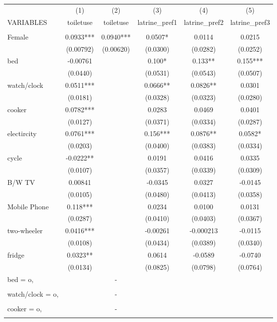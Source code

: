\documentclass[]{article}
\begin{document}
\begin{tabular}{lccccc} \hline
 & (1) & (2) & (3) & (4) & (5) \\
VARIABLES & toiletuse & toiletuse & latrine\_pref1 & latrine\_pref2 & latrine\_pref3 \\ \hline
 &  &  &  &  &  \\
Female & 0.0933*** & 0.0940*** & 0.0507* & 0.0114 & 0.0215 \\
 & (0.00792) & (0.00620) & (0.0300) & (0.0282) & (0.0252) \\
bed & -0.00761 &  & 0.100* & 0.133** & 0.155*** \\
 & (0.0440) &  & (0.0531) & (0.0543) & (0.0507) \\
watch/clock & 0.0511*** &  & 0.0666** & 0.0826** & 0.0301 \\
 & (0.0181) &  & (0.0328) & (0.0323) & (0.0280) \\
cooker & 0.0782*** &  & 0.0283 & 0.0469 & 0.0401 \\
 & (0.0127) &  & (0.0371) & (0.0334) & (0.0287) \\
electircity & 0.0761*** &  & 0.156*** & 0.0876** & 0.0582* \\
 & (0.0203) &  & (0.0400) & (0.0383) & (0.0334) \\
cycle & -0.0222** &  & 0.0191 & 0.0416 & 0.0335 \\
 & (0.0107) &  & (0.0357) & (0.0339) & (0.0309) \\
B/W TV & 0.00841 &  & -0.0345 & 0.0327 & -0.0145 \\
 & (0.0105) &  & (0.0480) & (0.0413) & (0.0358) \\
Mobile Phone & 0.118*** &  & 0.0234 & 0.0100 & 0.0131 \\
 & (0.0287) &  & (0.0410) & (0.0403) & (0.0367) \\
two-wheeler & 0.0416*** &  & -0.00261 & -0.000213 & -0.0115 \\
 & (0.0108) &  & (0.0434) & (0.0389) & (0.0340) \\
fridge & 0.0323** &  & 0.0614 & -0.0589 & -0.0740 \\
 & (0.0134) &  & (0.0825) & (0.0798) & (0.0764) \\
bed = o, &  & - &  &  &  \\
 &  &  &  &  &  \\
watch/clock = o, &  & - &  &  &  \\
 &  &  &  &  &  \\
cooker = o, &  & - &  &  &  \\
 &  &  &  &  &  \\

\end{tabular}
\end{document}
